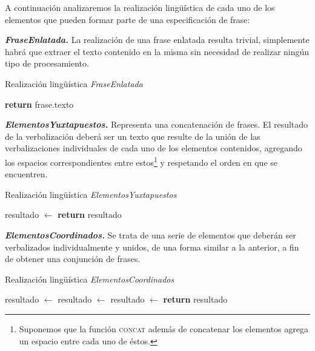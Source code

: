 A continuación analizaremos la realización lingüística de cada uno de los elementos que pueden formar parte de una especificación de frase:

\medskip
\noindent
\textbf{\emph{FraseEnlatada.}} La realización de una frase enlatada resulta trivial, simplemente habrá que extraer el texto contenido en la misma sin necesidad de realizar ningún tipo de procesamiento.

\begin{algorithm}[H]
\caption{Realización lingüística \textit{FraseEnlatada}}
\begin{algorithmic}[1]
\State \textbf{return} frase.texto
\EndFunction
\end{algorithmic}
\end{algorithm}


\medskip
\noindent
\textbf{\emph{ElementosYuxtapuestos.}} Representa una concatenación de frases. El resultado de la verbalización deberá ser un texto que resulte de la unión de las verbalizaciones individuales de cada uno de los elementos contenidos, agregando los espacios correspondientes entre estos\footnote{Suponemos que la función \textsc{concat} además de concatenar los elementos agrega un espacio entre cada uno de éstos.} y respetando el orden en que se encuentren. 

\begin{algorithm}[H]
\caption{Realización lingüística \textit{ElementosYuxtapuestos}} 
\begin{algorithmic}[1]
\State resultado $\gets$ 
\EndFor
\State \textbf{return} resultado
\EndFunction
\end{algorithmic}
\end{algorithm}

\medskip
\noindent
\textbf{\emph{ElementosCoordinados.}} Se trata de una serie de elementos que deberán ser verbalizados individualmente y unidos, de una forma similar a la anterior, a fin de obtener una conjunción de frases.

\begin{algorithm}[H]
\caption{Realización lingüística \textit{ElementosCoordinados}}
\begin{algorithmic}[1]
\State resultado $\gets$ 
\State resultado $\gets$ 
\Else
\State resultado $\gets$ 
\EndIf
\EndFor
\State \textbf{return} resultado
\EndFunction
\end{algorithmic}
\end{algorithm}

